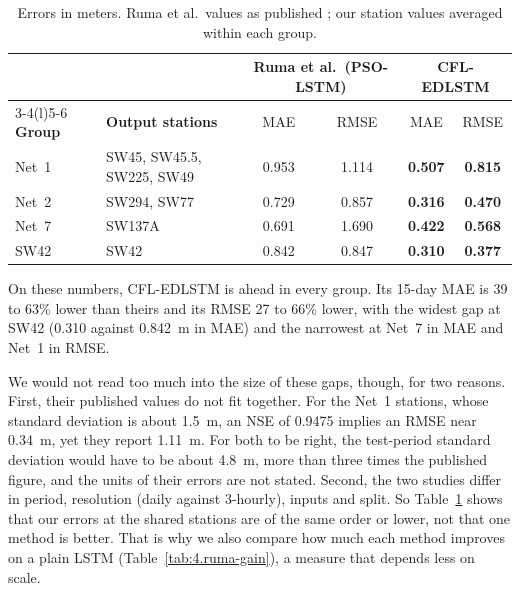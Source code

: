 \begin{table}[htbp]
  \centering
  \caption{15-day errors at the shared stations.}
  \label{tab:4.ruma-abs}
  \small
  \setlength{\tabcolsep}{5pt}
  \begin{tabular}{@{}l l cc cc@{}}
    \toprule
    & & \multicolumn{2}{c}{Ruma et al.\ (PSO-LSTM)} & \multicolumn{2}{c}{CFL-EDLSTM} \\
    \cmidrule(lr){3-4}\cmidrule(l){5-6}
    \textbf{Group} & \textbf{Output stations} & MAE & RMSE & MAE & RMSE \\
    \midrule
    Net~1   & SW45, SW45.5, SW225, SW49 & 0.953 & 1.114 & \textbf{0.507} & \textbf{0.815} \\
    Net~2   & SW294, SW77               & 0.729 & 0.857 & \textbf{0.316} & \textbf{0.470} \\
    Net~7   & SW137A   & 0.691 & 1.690  & \textbf{0.422} & \textbf{0.568} \\
    SW42    & SW42                      & 0.842 & 0.847 & \textbf{0.310} & \textbf{0.377} \\
    \bottomrule
  \end{tabular}
  \caption*{\footnotesize Errors in meters. Ruma et al.\ values as published \cite{Ruma2023}; our station values averaged within each group.}
\end{table}

On these numbers, CFL-EDLSTM is ahead in every group. Its 15-day MAE is 39 to
63\% lower than theirs and its RMSE 27 to 66\% lower, with the widest gap at SW42
(0.310 against 0.842~m in MAE) and the narrowest at Net~7 in MAE and Net~1 in
RMSE.

We would not read too much into the size of these gaps, though, for two reasons.
First, their published values do not fit together. For the Net~1 stations, whose
standard deviation is about 1.5~m, an NSE of 0.9475 implies an RMSE near 0.34~m,
yet they report 1.11~m. For both to be right, the test-period standard deviation
would have to be about 4.8~m, more than three times the published figure, and
the units of their errors are not stated. Second, the two studies differ in
period, resolution (daily against 3-hourly), inputs and split. So
Table~\ref{tab:4.ruma-abs} shows that our errors at the shared stations are of
the same order or lower, not that one method is better. That is why we also
compare how much each method improves on a plain LSTM
(Table~\ref{tab:4.ruma-gain}), a measure that depends less on scale.


